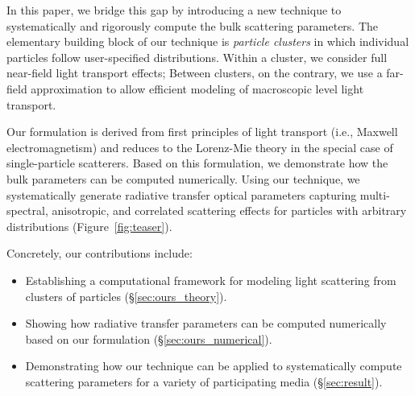 In this paper, we bridge this gap by introducing a new technique to systematically and rigorously compute the bulk scattering parameters. %
The elementary building block of our technique is \emph{particle clusters} in which individual particles follow user-specified distributions.
Within a cluster, we consider full near-field light transport effects; Between clusters, on the contrary, we use a far-field approximation to allow efficient modeling of macroscopic level light transport.

Our formulation is derived from first principles of light transport (i.e., Maxwell electromagnetism) and reduces to the Lorenz-Mie theory in the special case of single-particle scatterers. Based on this formulation, we demonstrate how the bulk parameters can be computed numerically. Using our technique, we systematically generate radiative transfer optical parameters capturing multi-spectral, anisotropic, and correlated scattering effects for particles with arbitrary distributions (Figure~\ref{fig:teaser}).

Concretely, our contributions include:
%
\begin{itemize}
    \item Establishing a computational framework for modeling light scattering from clusters of particles (\S\ref{sec:ours_theory}).
    \item Showing how radiative transfer parameters can be computed numerically based on our formulation (\S\ref{sec:ours_numerical}).
    \item Demonstrating how our technique can be applied to systematically compute scattering parameters for a variety of participating media (\S\ref{sec:result}).
\end{itemize}
